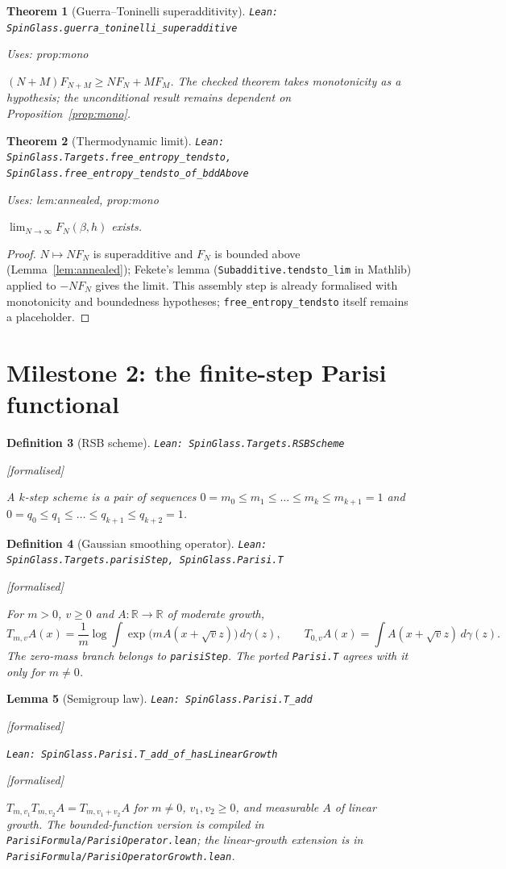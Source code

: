 \documentclass[11pt]{article}
\providecommand{\lean}[1]{\leavevmode\par\nopagebreak
  {\noindent\normalfont\footnotesize\raggedright\texttt{Lean: #1}\par}\nopagebreak}
\providecommand{\leanok}{\par\nopagebreak
  {\noindent\normalfont\footnotesize\textcolor{green!50!black}{[formalised]}\par}\nopagebreak}
\providecommand{\uses}[1]{\par\nopagebreak
  {\noindent\normalfont\footnotesize Uses: #1\par}\nopagebreak}
\newtheorem{theorem}{Theorem}[section]
\newtheorem{lemma}[theorem]{Lemma}
\newtheorem{definition}[theorem]{Definition}
\newcommand{\R}{\mathbb{R}}
\begin{document}
\begin{theorem}[Guerra--Toninelli superadditivity]
\lean{SpinGlass.guerra\_toninelli\_superadditive}
\uses{prop:mono}
$(N+M)F_{N+M}\ge NF_N+MF_M$.
The checked theorem takes monotonicity as a hypothesis; the unconditional result
remains dependent on Proposition~\ref{prop:mono}.
\end{theorem}

\begin{theorem}[Thermodynamic limit]
\lean{SpinGlass.Targets.free\_entropy\_tendsto, SpinGlass.free\_entropy\_tendsto\_of\_bddAbove}
\uses{lem:annealed, prop:mono}
$\lim_{N\to\infty}F_N(\beta,h)$ exists.
\end{theorem}
\begin{proof}
$N\mapsto NF_N$ is superadditive and $F_N$ is bounded above (Lemma~\ref{lem:annealed});
Fekete's lemma (\texttt{Subadditive.tendsto\_lim} in Mathlib) applied to $-NF_N$ gives the
limit. This assembly step is already formalised with monotonicity and boundedness
hypotheses; \texttt{free\_entropy\_tendsto} itself remains a placeholder.
\end{proof}

\section{Milestone 2: the finite-step Parisi functional}

\begin{definition}[RSB scheme]
\lean{SpinGlass.Targets.RSBScheme}\leanok
A $k$-step scheme is a pair of sequences
$0=m_0\le m_1\le\dots\le m_k\le m_{k+1}=1$ and
$0=q_0\le q_1\le\dots\le q_{k+1}\le q_{k+2}=1$.
\end{definition}

\begin{definition}[Gaussian smoothing operator]
\lean{SpinGlass.Targets.parisiStep, SpinGlass.Parisi.T}\leanok
For $m>0$, $v\ge0$ and $A:\R\to\R$ of moderate growth,
\[
T_{m,v}A(x)=\frac1m\log\int\exp\big(mA(x+\sqrt v z)\big)\,d\gamma(z),
\qquad T_{0,v}A(x)=\int A(x+\sqrt vz)\,d\gamma(z).
\]
The zero-mass branch belongs to \texttt{parisiStep}. The ported \texttt{Parisi.T}
agrees with it only for $m\ne0$.
\end{definition}

\begin{lemma}[Semigroup law]
\lean{SpinGlass.Parisi.T\_add}\leanok
\lean{SpinGlass.Parisi.T\_add\_of\_hasLinearGrowth}\leanok
$T_{m,v_1}T_{m,v_2}A=T_{m,v_1+v_2}A$ for $m\ne0$, $v_1,v_2\ge0$, and measurable
$A$ of linear growth. The bounded-function version is compiled in
\texttt{ParisiFormula/ParisiOperator.lean}; the linear-growth extension is in
\texttt{ParisiFormula/ParisiOperatorGrowth.lean}.
\end{lemma}
\end{document}
